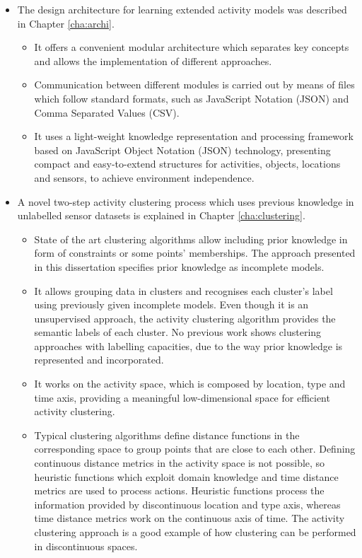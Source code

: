  \begin{itemize}
 \item The design architecture for learning extended activity models was described in Chapter \ref{cha:archi}.
 \begin{itemize}
  \item It offers a convenient modular architecture which separates key concepts and allows the implementation of different approaches.
  \item Communication between different modules is carried out by means of files which follow standard formats, such as JavaScript Notation (JSON) and Comma Separated Values (CSV). 
  \item It uses a light-weight knowledge representation and processing framework based on JavaScript Object Notation (JSON) technology, presenting compact and easy-to-extend structures for activities, objects, locations and sensors, to achieve environment independence.
 \end{itemize}

 \item A novel two-step activity clustering process which uses previous knowledge in unlabelled sensor datasets is explained in Chapter \ref{cha:clustering}. %
 \begin{itemize}
  \item State of the art clustering algorithms allow including prior knowledge in form of constraints or some points' memberships. The approach presented in this dissertation specifies prior knowledge as incomplete models.
  \item It allows grouping data in clusters and recognises each cluster's label using previously given incomplete models. Even though it is an unsupervised approach, the activity clustering algorithm provides the semantic labels of each cluster. No previous work shows clustering approaches with labelling capacities, due to the way prior knowledge is represented and incorporated.
  \item It works on the activity space, which is composed by location, type and time axis, providing a meaningful low-dimensional space for efficient activity clustering.
  \item Typical clustering algorithms define distance functions in the corresponding space to group points that are close to each other. Defining continuous distance metrics in the activity space is not possible, so heuristic functions which exploit domain knowledge and time distance metrics are used to process actions. Heuristic functions process the information provided by discontinuous location and type axis, whereas time distance metrics work on the continuous axis of time. The activity clustering approach is a good example of how clustering can be performed in discontinuous spaces.
 \end{itemize}


\end{itemize}
